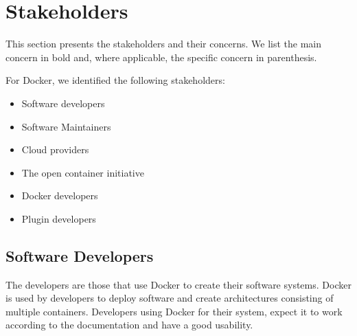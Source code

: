 
\section{Stakeholders}
\label{sec:stakeholders}
This section presents the stakeholders and their concerns. We list the main concern in bold and, where applicable, the specific concern in parenthesis.

For Docker, we identified the following stakeholders:
\begin{itemize}
\item Software developers
\item Software Maintainers
\item Cloud providers
\item The open container initiative
\item Docker developers
\item Plugin developers
\end{itemize}

\subsection*{Software Developers}
The developers are those that use Docker to create their software systems. Docker is used by developers to deploy software and create architectures consisting of multiple containers. Developers using Docker for their system, expect it to work according to the documentation and have a good usability.

